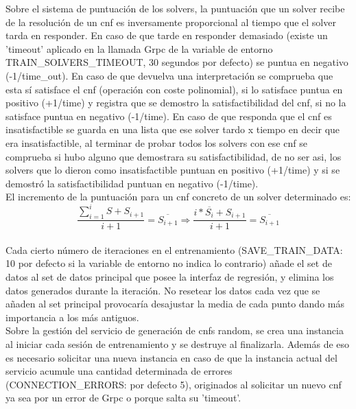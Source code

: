 \documentclass[11pt]{article}
\begin{document}
					Sobre el sistema de puntuación de los solvers, la puntuación que un solver recibe de la resolución de un cnf es inversamente proporcional al tiempo que el solver tarda en responder. 
					En caso de que tarde en responder demasiado (existe un 'timeout' aplicado en la llamada Grpc de la variable de entorno TRAIN\_SOLVERS\_TIMEOUT, 30 segundos por defecto) 
					se puntua en negativo (-1/time\_out).
					En caso de que devuelva una interpretación se comprueba que esta sí satisface el cnf (operación con coste polinomial), 
					si lo satisface puntua en positivo (+1/time) y registra que se demostro la satisfactibilidad del cnf, si no la satisface puntua en negativo (-1/time). 
					En caso de que responda que el cnf es insatisfactible se guarda en una lista que ese solver tardo x tiempo en decir que era insatisfactible, 
					al terminar de probar todos los solvers con ese cnf se comprueba si hubo alguno que demostrara su satisfactibilidad, de no ser asi, 
					los solvers que lo dieron como insatisfactible puntuan en positivo (+1/time) y si se demostró la satisfactibilidad puntuan en negativo (-1/time). \\

					El incremento de la puntuación para un cnf concreto de un solver determinado es: \\
					\begin{equation}
						\frac{\sum_{i=1}^{i} S + S_{i+1}}{i+1}=\overline{S_{i+1}} \Longrightarrow \frac{i*\overline{S_i} + S_{i+1}}{i+1}=\overline{S_{i+1}}
					\end{equation} \\

					Cada cierto número de iteraciones en el entrenamiento (SAVE\_TRAIN\_DATA: 10 por defecto si la variable de entorno no indica lo contrario) añade el set de datos al set de datos principal que posee
					la interfaz de regresión, y elimina los datos generados durante la iteración. No resetear los datos cada vez que se añaden al set principal provocaría desajustar la media de cada punto dando más importancia a
					los más antiguos. \\

					Sobre la gestión del servicio de generación de cnfs random, se crea una instancia al iniciar cada sesión de entrenamiento y se destruye al finalizarla. Además de eso es necesario solicitar
					una nueva instancia en caso de que la instancia actual del servicio acumule una cantidad determinada de errores (CONNECTION\_ERRORS: por defecto 5), originados al solicitar un nuevo cnf ya sea
					por un error de Grpc o porque salta su 'timeout'. \\
\end{document}
